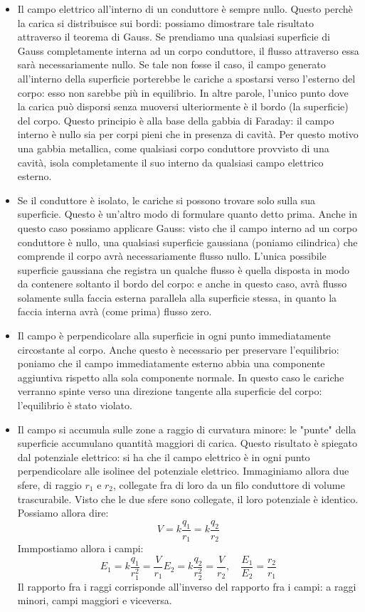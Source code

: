 \documentclass[a4paper,12pt]{article}
\begin{document}
\begin{itemize}
  \item Il campo elettrico all'interno di un conduttore è sempre nullo. Questo perchè la carica si distribuisce sui bordi: possiamo dimostrare tale risultato attraverso il teorema di Gauss. Se prendiamo una qualsiasi superficie di Gauss
    completamente interna ad un corpo conduttore, il flusso attraverso essa sarà necessariamente nullo. Se tale non fosse il caso, il campo generato all'interno della superficie porterebbe le cariche a spostarsi verso l'esterno del corpo:
    esso non sarebbe più in equilibrio. In altre parole, l'unico punto dove la carica può disporsi senza muoversi ulteriormente è il bordo (la superficie) del corpo. Questo principio è alla base della gabbia di Faraday: il campo interno
    è nullo sia per corpi pieni che in presenza di cavità. Per questo motivo una gabbia metallica, come qualsiasi corpo conduttore provvisto di una cavità, isola completamente il suo interno da qualsiasi campo elettrico esterno.
  \item Se il conduttore è isolato, le cariche si possono trovare solo sulla sua superficie. Questo è un'altro modo di formulare quanto detto prima. Anche in questo caso possiamo applicare Gauss: visto che il campo interno ad un corpo conduttore
    è nullo, una qualsiasi superficie gaussiana (poniamo cilindrica) che comprende il corpo avrà necessariamente flusso nullo. L'unica possibile superficie gaussiana che registra un qualche flusso è quella disposta in modo da contenere soltanto il bordo 
    del corpo: e anche in questo caso, avrà flusso solamente sulla faccia esterna parallela alla superficie stessa, in quanto la faccia interna avrà (come prima) flusso zero.
  \item Il campo è perpendicolare alla superficie in ogni punto immediatamente circostante al corpo. Anche questo è necessario per preservare l'equilibrio: poniamo che il campo immediatamente esterno abbia una componente aggiuntiva
    rispetto alla sola componente normale. In questo caso le cariche verranno spinte verso una direzione tangente alla superficie del corpo: l'equilibrio è stato violato.
  \item Il campo si accumula sulle zone a raggio di curvatura minore: le "punte" della superficie accumulano quantità maggiori di carica. Questo risultato è spiegato dal potenziale elettrico: si ha che il campo elettrico è in ogni
    punto perpendicolare alle isolinee del potenziale elettrico. Immaginiamo allora due sfere, di raggio $r_1$ e $r_2$, collegate fra di loro da un filo conduttore di volume trascurabile. Visto che le due sfere sono collegate,
    il loro potenziale è identico. Possiamo allora dire:
    $$ V = k \frac{q_1}{r_1} = k \frac{q_2}{r_2} $$
    Immpostiamo allora i campi:
    $$ E_1 = k \frac{q_1}{r_1^2} = \frac{V}{r_1} E_2 = k \frac{q_2}{r_2^2} = \frac{V}{r_2}, \quad  \frac{E_1}{E_2} = \frac{r_2}{r_1} $$
    Il rapporto fra i raggi corrisponde all'inverso del rapporto fra i campi: a raggi minori, campi maggiori e viceversa.
\end{itemize} 
\end{document}
